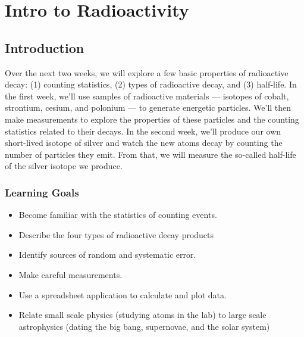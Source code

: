\chapter{Intro to Radioactivity}



\section{Introduction}

Over the next two weeks, we will explore a few basic properties of radioactive decay: (1) counting statistics, (2) types of radioactive decay, and (3) half-life. In the first week, we'll use samples of radioactive materials --- isotopes of cobalt, strontium, cesium, and polonium --- to generate energetic particles. We'll then make measurements to explore the properties of these particles and the counting statistics related to their decays. In the second week, we’ll produce our own short-lived isotope of silver and watch the new atoms decay by counting the number of particles they emit. From that, we will measure the so-called half-life of the silver isotope we produce.

\subsection{Learning Goals}

\begin{itemize}
	\item Become familiar with the statistics of counting events.
	
	\item Describe the four types of radioactive decay products
	
	\item Identify sources of random and systematic error.
	
	\item Make careful measurements.
	
	\item Use a spreadsheet application to calculate and plot data.
	
	\item Relate small scale physics (studying atoms in the lab) to large scale astrophysics (dating the big bang, supernovae, and the solar system)
\end{itemize}


